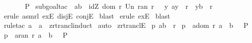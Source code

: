 \begin{isabellebody}
\ \ \ \ \ {\isacharbar}{\isacharbrackright}\ {\isacharequal}{\isacharequal}{\isachargreater}\ P{\isachardoublequoteclose}\isanewline
%
\isadelimproof
%
\endisadelimproof
%
\isatagproof
{}\isamarkupfalse%
\ {\isacharparenleft}subgoal{\isacharunderscore}tac\ {\isachardoublequoteopen}\ {\isacharparenleft}a{\isacharcomma}b{\isacharparenright}\ {\isacharcolon}\ idZ\ {\isacharparenleft}dom\ r\ Un\ ran\ r{\isacharparenright}\ {\isacharbar}\ {\isacharparenleft}{\isacharquery}\ y{\isachardot}\ {\isacharparenleft}a{\isacharcomma}y{\isacharparenright}\ {\isacharcolon}\ {\isacharparenleft}r{\isacharpercent}{\isacharasterisk}{\isacharparenright}\ {\isacharampersand}\ {\isacharparenleft}y{\isacharcomma}b{\isacharparenright}\ {\isacharcolon}\ r{\isacharparenright}\ {\isachardoublequoteclose}{\isacharparenright}\isanewline
{}\isamarkupfalse%
\ {\isacharparenleft}erule\ asm{\isacharunderscore}rl\ exE\ disjE\ conjE{\isacharparenright}{\isacharplus}\isanewline
{}\isamarkupfalse%
\ blast\isanewline
{}\isamarkupfalse%
\ {\isacharparenleft}erule\ exE{\isacharparenright}\isanewline
{}\isamarkupfalse%
\ blast\isanewline
{}\isamarkupfalse%
\ {\isacharparenleft}rule{\isacharunderscore}tac\ a\ {\isacharequal}\ {\isachardoublequoteopen}a{\isachardoublequoteclose}\ \ zrtrancl{\isacharunderscore}induct{\isacharparenright}\isanewline
{}\isamarkupfalse%
\ {\isacharparenleft}auto{\isacharparenright}\isanewline
{}\isamarkupfalse%
%
\endisatagproof
{\isafoldproof}%
%
\isadelimproof
\isanewline
%
\endisadelimproof
\isanewline
{}\isamarkupfalse%
\ zrtranclE{\isacharcolon}\isanewline
{}\ p{}{\isacharcolon}\ {\isachardoublequoteopen}{\isacharparenleft}a{\isacharcomma}b{\isacharparenright}\ {\isacharcolon}\ r{\isacharpercent}{\isacharasterisk}{\isachardoublequoteclose}\isanewline
{}\ p{}{\isacharcolon}\ {\isachardoublequoteopen}{\isacharbrackleft}{\isacharbar}\ a{\isacharcolon}{\isacharparenleft}dom\ r{\isacharparenright}{\isacharsemicolon}\ a\ {\isacharequal}\ b{\isacharbar}{\isacharbrackright}\ \ {\isacharequal}{\isacharequal}{\isachargreater}\ P{\isachardoublequoteclose}\isanewline
{}\ p{}{\isacharcolon}\ {\isachardoublequoteopen}{\isacharbrackleft}{\isacharbar}\ a{\isacharcolon}{\isacharparenleft}ran\ r{\isacharparenright}{\isacharsemicolon}\ a\ {\isacharequal}\ b{\isacharbar}{\isacharbrackright}\ \ {\isacharequal}{\isacharequal}{\isachargreater}\ P{\isachardoublequoteclose}\ \ \ \ \ \ \ \ \ \isanewline

\end{isabellebody}
